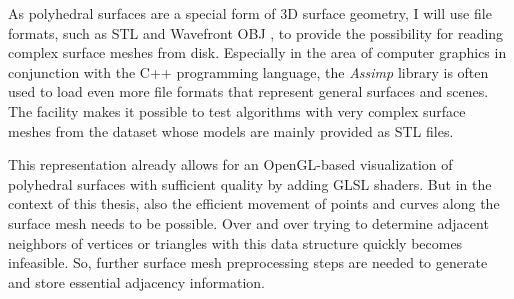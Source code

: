 \documentclass{stdlocal}
\begin{document}
  \noindent
  As polyhedral surfaces are a special form of 3D surface geometry, I will use file formats, such as STL \autocite{stl-file-format} and Wavefront OBJ \autocite{obj-file-format}, to provide the possibility for reading complex surface meshes from disk.
  Especially in the area of computer graphics in conjunction with the C++ programming language, the \textit{Assimp} library \autocite{assimp} is often used to load even more file formats that represent general surfaces and scenes.
  The facility makes it possible to test algorithms with very complex surface meshes from the  dataset whose models are mainly provided as STL files.

  This representation already allows for an OpenGL-based visualization of polyhedral surfaces with sufficient quality by adding GLSL shaders.
  But in the context of this thesis, also the efficient movement of points and curves along the surface mesh needs to be possible.
  Over and over trying to determine adjacent neighbors of vertices or triangles with this data structure quickly becomes infeasible.
  So, further surface mesh preprocessing steps are needed to generate and store essential adjacency information.
\end{document}
